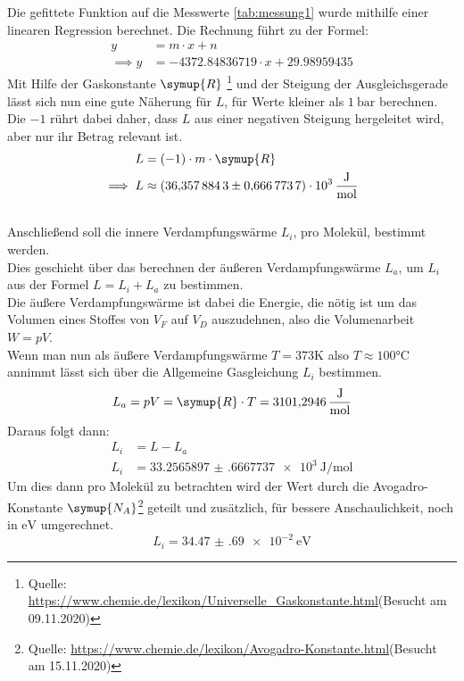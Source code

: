 Die gefittete Funktion auf die Messwerte \ref{tab:messung1} wurde mithilfe einer linearen Regression berechnet.
Die Rechnung führt zu der Formel:
\begin{align}
    y&=m\cdot x+n\\
    \implies y&=-4372.84836719 \cdot x+29.98959435
\end{align}
Mit Hilfe der Gaskonstante $\symup{R}$   \footnote{Quelle: \url{https://www.chemie.de/lexikon/Universelle_Gaskonstante.html}(Besucht am 09.11.2020)}
und der Steigung der Ausgleichsgerade lässt sich nun eine gute Näherung für $L$, für Werte kleiner als $\SI{1}{\bar}$ berechnen.
Die $-1$ rührt dabei daher, dass $L$ aus einer negativen Steigung hergeleitet wird, aber nur ihr Betrag relevant ist.
\begin{align}
    L&=(-1) \cdot m \cdot \symup{R}\\
    \implies L&\approx\SI{36.3578843(6667737)e3}{\joule\per\mol} \nonumber
\end{align}\\
Anschließend soll die innere Verdampfungswärme $L_i$, pro Molekül, bestimmt werden.\\
Dies geschieht über das berechnen der äußeren Verdampfungswärme $L_a$, um $L_i$ aus der Formel $L=L_i+L_a$ zu bestimmen.\\
Die äußere Verdampfungswärme ist dabei die Energie, die nötig ist um das Volumen eines Stoffes von $V_F$ auf $V_D$ auszudehnen,
also die Volumenarbeit $W=pV$.\\
Wenn man nun als äußere Verdampfungswärme $T=373 \si{\kelvin}$ also $T\approx 100 \si{\celsius}$ annimmt lässt sich über die Allgemeine Gasgleichung $L_i$ bestimmen.
\begin{equation}
    L_a=pV=\symup{R} \cdot T = \SI{3101.2946}{\joule\per\mol} 
\end{equation}
Daraus folgt dann:
\begin{align}
    L_i&=L-L_a \\
    L_i&=\SI{33.2565897(6667737)e3}{\joule\per\mol} \nonumber
\end{align}
Um dies dann pro Molekül zu betrachten wird der Wert durch die Avogadro-Konstante $\symup{N_A}$\footnote{Quelle: \url{https://www.chemie.de/lexikon/Avogadro-Konstante.html}(Besucht am 15.11.2020)}
geteilt und zusätzlich, für bessere Anschaulichkeit,
noch in $\si{\electronvolt}$ umgerechnet.
\begin{equation}
    L_i=\SI{34.47(69)e-2}{\electronvolt} \nonumber
\end{equation}

